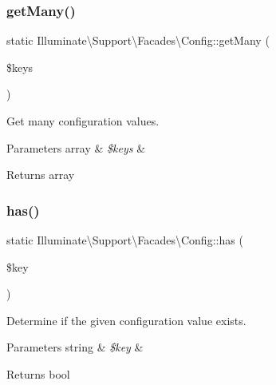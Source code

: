 \subsubsection{\texorpdfstring{get\+Many()}{getMany()}}
{\footnotesize\ttfamily static Illuminate\textbackslash{}\+Support\textbackslash{}\+Facades\textbackslash{}\+Config\+::get\+Many (\begin{DoxyParamCaption}\item[{}]{\$keys }\end{DoxyParamCaption})\hspace{0.3cm}{\ttfamily [static]}}

Get many configuration values.


\begin{DoxyParams}[1]{Parameters}
array & {\em \$keys} & \\
\hline
\end{DoxyParams}
\begin{DoxyReturn}{Returns}
array 
\end{DoxyReturn}
\mbox{\label{class_illuminate_1_1_support_1_1_facades_1_1_config_ae0f1ddeede4ff756dadd4b6048c25888}} 
\subsubsection{\texorpdfstring{has()}{has()}}
{\footnotesize\ttfamily static Illuminate\textbackslash{}\+Support\textbackslash{}\+Facades\textbackslash{}\+Config\+::has (\begin{DoxyParamCaption}\item[{}]{\$key }\end{DoxyParamCaption})\hspace{0.3cm}{\ttfamily [static]}}

Determine if the given configuration value exists.


\begin{DoxyParams}[1]{Parameters}
string & {\em \$key} & \\
\hline
\end{DoxyParams}
\begin{DoxyReturn}{Returns}
bool 
\end{DoxyReturn}
\mbox{\label{class_illuminate_1_1_support_1_1_facades_1_1_config_a9c38dfaca860625f3f3ec57ba2d94f62}} 
